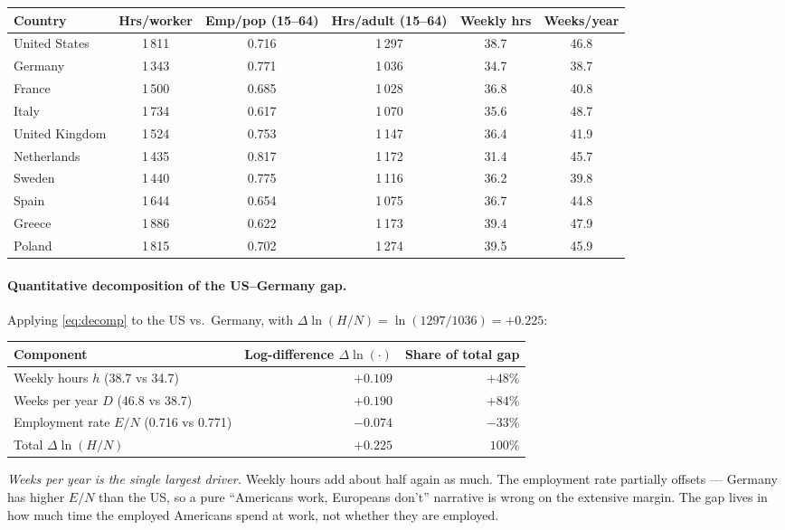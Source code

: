 \documentclass[11pt,a4paper]{article}
\begin{document}
\begin{center}
\footnotesize
\begin{tabular}{lccccc}
\toprule
Country & Hrs/worker & Emp/pop (15--64) & Hrs/adult (15--64) & Weekly hrs & Weeks/year \\
\midrule
United States   & 1\,811 & 0.716 & 1\,297 & 38.7 & 46.8 \\
Germany         & 1\,343 & 0.771 & 1\,036 & 34.7 & 38.7 \\
France          & 1\,500 & 0.685 & 1\,028 & 36.8 & 40.8 \\
Italy           & 1\,734 & 0.617 & 1\,070 & 35.6 & 48.7 \\
United Kingdom  & 1\,524 & 0.753 & 1\,147 & 36.4 & 41.9 \\
Netherlands     & 1\,435 & 0.817 & 1\,172 & 31.4 & 45.7 \\
Sweden          & 1\,440 & 0.775 & 1\,116 & 36.2 & 39.8 \\
Spain           & 1\,644 & 0.654 & 1\,075 & 36.7 & 44.8 \\
Greece          & 1\,886 & 0.622 & 1\,173 & 39.4 & 47.9 \\
Poland          & 1\,815 & 0.702 & 1\,274 & 39.5 & 45.9 \\
\bottomrule
\end{tabular}
\end{center}

\paragraph{Quantitative decomposition of the US--Germany gap.}
Applying \eqref{eq:decomp} to the US vs.\ Germany, with $\Delta\ln(H/N)=\ln(1297/1036)=+0.225$:
\begin{center}
\footnotesize
\begin{tabular}{lrr}
\toprule
Component & Log-difference $\Delta\ln(\cdot)$ & Share of total gap \\
\midrule
Weekly hours $h$ (38.7 vs 34.7) & $+0.109$ & $+48\%$ \\
Weeks per year $D$ (46.8 vs 38.7) & $+0.190$ & $+84\%$ \\
Employment rate $E/N$ (0.716 vs 0.771) & $-0.074$ & $-33\%$ \\
\midrule
Total $\Delta\ln(H/N)$ & $+0.225$ & $100\%$ \\
\bottomrule
\end{tabular}
\end{center}
\emph{Weeks per year is the single largest driver.} Weekly hours add about half again as much. The employment rate partially offsets --- Germany has higher $E/N$ than the US, so a pure ``Americans work, Europeans don't'' narrative is wrong on the extensive margin. The gap lives in how much time the employed Americans spend at work, not whether they are employed.
\end{document}
